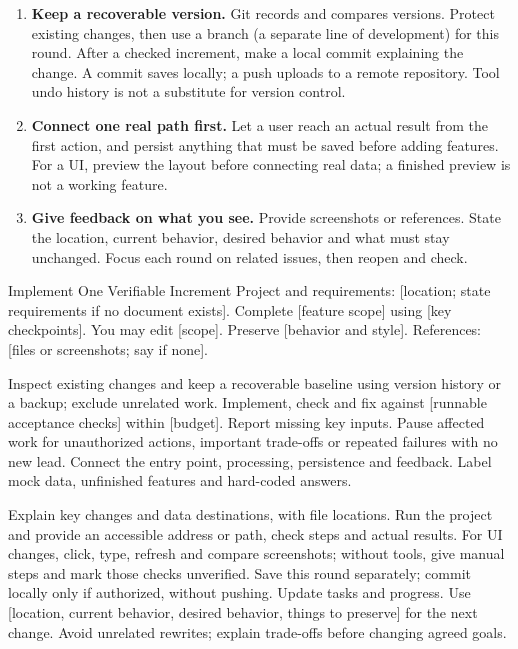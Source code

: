 \begin{enumerate}
\item \textbf{Keep a recoverable version.} Git records and compares versions. Protect existing changes, then use a branch (a separate line of development) for this round. After a checked increment, make a local commit explaining the change. A commit saves locally; a push uploads to a remote repository. Tool undo history is not a substitute for version control.
\item \textbf{Connect one real path first.} Let a user reach an actual result from the first action, and persist anything that must be saved before adding features. For a UI, preview the layout before connecting real data; a finished preview is not a working feature.
\item \textbf{Give feedback on what you see.} Provide screenshots or references. State the location, current behavior, desired behavior and what must stay unchanged. Focus each round on related issues, then reopen and check.
\end{enumerate}
\begin{prompt}{Implement One Verifiable Increment}
Project and requirements: [location; state requirements if no document exists]. Complete [feature scope] using [key checkpoints]. You may edit [scope]. Preserve [behavior and style]. References: [files or screenshots; say if none].\par
Inspect existing changes and keep a recoverable baseline using version history or a backup; exclude unrelated work. Implement, check and fix against [runnable acceptance checks] within [budget]. Report missing key inputs. Pause affected work for unauthorized actions, important trade-offs or repeated failures with no new lead. Connect the entry point, processing, persistence and feedback. Label mock data, unfinished features and hard-coded answers.\par
Explain key changes and data destinations, with file locations. Run the project and provide an accessible address or path, check steps and actual results. For UI changes, click, type, refresh and compare screenshots; without tools, give manual steps and mark those checks unverified. Save this round separately; commit locally only if authorized, without pushing. Update tasks and progress. Use [location, current behavior, desired behavior, things to preserve] for the next change. Avoid unrelated rewrites; explain trade-offs before changing agreed goals.
\end{prompt}

